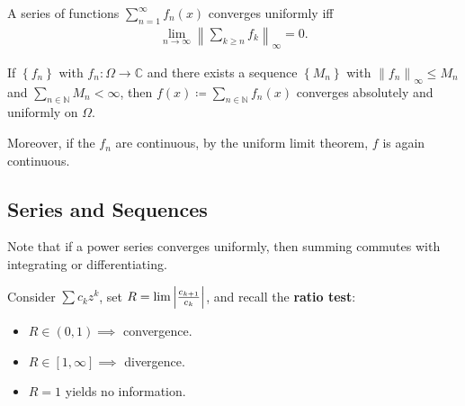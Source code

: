\begin{proposition}

A series of functions \(\sum_{n=1}^\infty f_n(x)\) converges uniformly
iff
\begin{align*}  
\lim_{n\to \infty} {\left\lVert { \sum_{k\geq n} f_k } \right\rVert}_\infty = 0
.\end{align*}

\end{proposition}

\begin{theorem}

If \(\left\{{f_n}\right\}\) with \(f_n: \Omega \to {\mathbb{C}}\) and
there exists a sequence \(\left\{{M_n}\right\}\) with
\({\left\lVert {f_n} \right\rVert}_\infty \leq M_n\) and
\(\sum_{n\in {\mathbb{N}}} M_n < \infty\), then
\(f(x) \coloneqq\sum_{n\in {\mathbb{N}}} f_n(x)\) converges absolutely
and uniformly on \(\Omega\).

Moreover, if the \(f_n\) are continuous, by the uniform limit theorem,
\(f\) is again continuous.

\end{theorem}

\hypertarget{series-and-sequences}{%
\subsection{Series and Sequences}\label{series-and-sequences}}

\begin{remark}

Note that if a power series converges uniformly, then summing commutes
with integrating or differentiating.

\end{remark}

\begin{fact}

Consider \(\sum c_k z^k\), set
\(R = \lim {\left\lvert {c_{k+1} \over c_k} \right\rvert}\), and recall
the \textbf{ratio test}:

\begin{itemize}
\tightlist
\item
  \(R\in (0, 1) \implies\) convergence.
\item
  \(R\in [1, \infty] \implies\) divergence.
\item
  \(R=1\) yields no information.
\end{itemize}

\end{fact}

